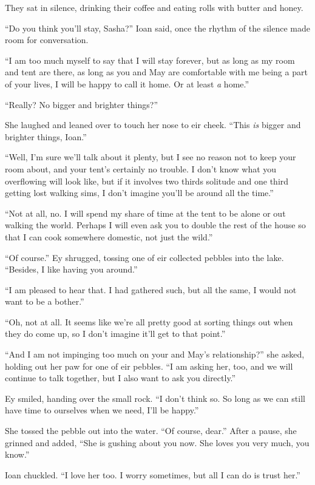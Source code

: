 They sat in silence, drinking their coffee and eating rolls with butter and honey.

``Do you think you'll stay, Sasha?'' Ioan said, once the rhythm of the silence made room for conversation.

``I am too much myself to say that I will stay forever, but as long as my room and tent are there, as long as you and May are comfortable with me being a part of your lives, I will be happy to call it home. Or at least \emph{a} home.''

``Really? No bigger and brighter things?''

She laughed and leaned over to touch her nose to eir cheek. ``This \emph{is} bigger and brighter things, Ioan.''

``Well, I'm sure we'll talk about it plenty, but I see no reason not to keep your room about, and your tent's certainly no trouble. I don't know what you overflowing will look like, but if it involves two thirds solitude and one third getting lost walking sims, I don't imagine you'll be around all the time.''

``Not at all, no. I will spend my share of time at the tent to be alone or out walking the world. Perhaps I will even ask you to double the rest of the house so that I can cook somewhere domestic, not just the wild.''

``Of course.'' Ey shrugged, tossing one of eir collected pebbles into the lake. ``Besides, I like having you around.''

``I am pleased to hear that. I had gathered such, but all the same, I would not want to be a bother.''

``Oh, not at all. It seems like we're all pretty good at sorting things out when they do come up, so I don't imagine it'll get to that point.''

``And I am not impinging too much on your and May's relationship?'' she asked, holding out her paw for one of eir pebbles. ``I am asking her, too, and we will continue to talk together, but I also want to ask you directly.''

Ey smiled, handing over the small rock. ``I don't think so. So long as we can still have time to ourselves when we need, I'll be happy.''

She tossed the pebble out into the water. ``Of course, dear.'' After a pause, she grinned and added, ``She is gushing about you now. She loves you very much, you know.''

Ioan chuckled. ``I love her too. I worry sometimes, but all I can do is trust her.''

